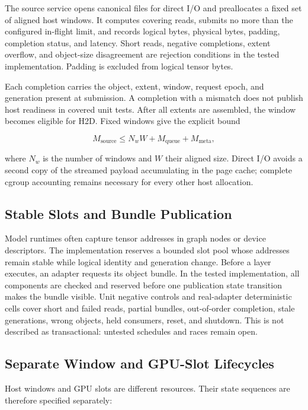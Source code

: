 \documentclass[letterpaper,twocolumn,10pt]{article}
\begin{document}
The source service opens canonical files for direct I/O and preallocates a
fixed set of aligned host windows.  It computes covering reads, submits no more
than the configured in-flight limit, and records logical bytes, physical bytes,
padding, completion status, and latency.  Short reads, negative completions,
extent overflow, and object-size disagreement are rejection conditions in the
tested implementation.  Padding is excluded from logical tensor bytes.

Each completion carries the object, extent, window, request epoch, and
generation present at submission.  A completion with a mismatch does not
publish host readiness in covered unit tests.  After all extents are assembled,
the window becomes eligible for H2D.  Fixed windows give the explicit bound

\begin{equation}
M_{\mathrm{source}} \leq N_w W + M_{\mathrm{queue}} + M_{\mathrm{meta}},
\end{equation}

where $N_w$ is the number of windows and $W$ their aligned size.  Direct I/O
avoids a second copy of the streamed payload accumulating in the page cache;
complete cgroup accounting remains necessary for every other host allocation.

\subsection{Stable Slots and Bundle Publication}

Model runtimes often capture tensor addresses in graph nodes or device
descriptors.  The implementation reserves a bounded slot pool whose addresses remain
stable while logical identity and generation change.  Before a layer executes,
an adapter requests its object bundle.  In the tested implementation, all
components are checked and reserved before one publication state transition
makes the bundle visible.  Unit negative controls and real-adapter deterministic
cells cover short and failed reads, partial bundles, out-of-order completion,
stale generations, wrong objects, held consumers, reset, and shutdown.  This is
not described as transactional: untested schedules and races remain open.

\subsection{Separate Window and GPU-Slot Lifecycles}

Host windows and GPU slots are different resources.  Their state sequences are
therefore specified separately:
\end{document}
